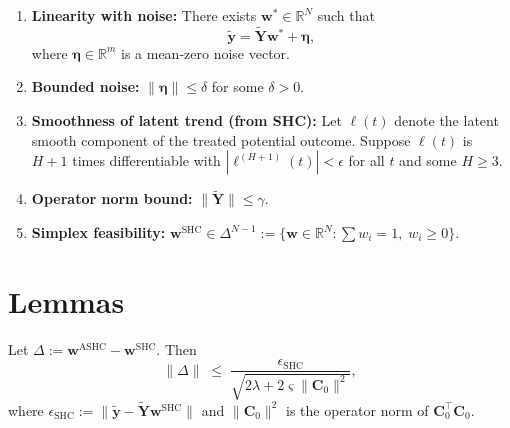 \documentclass{article}
\begin{document}
\begin{enumerate}
\item[\textbf{(A1)}] \textbf{Linearity with noise:} 
There exists $\mathbf{w}^* \in \mathbb{R}^N$ such that
\[
\widetilde{\mathbf{y}} = \widetilde{\mathbf{Y}} \mathbf{w}^* + \bm{\eta},
\]
where $\bm{\eta} \in \mathbb{R}^m$ is a mean-zero noise vector.

\item[\textbf{(A2)}] \textbf{Bounded noise:} 
$\|\bm{\eta}\| \leq \delta$ for some $\delta > 0$.

\item[\textbf{(A3)}] \textbf{Smoothness of latent trend (from SHC):} 
Let $\ell(t)$ denote the latent smooth component of the treated potential outcome.
Suppose $\ell(t)$ is $H+1$ times differentiable with $|\ell^{(H+1)}(t)| < \epsilon$
for all $t$ and some $H \geq 3$.

\item[\textbf{(A4)}] \textbf{Operator norm bound:} 
$\|\widetilde{\mathbf{Y}}\| \leq \gamma$.

\item[\textbf{(A5)}] \textbf{Simplex feasibility:} 
$\mathbf{w}^{\text{SHC}} \in \Delta^{N-1} := \{\mathbf{w} \in \mathbb{R}^N: \sum w_i = 1,\; w_i \geq 0\}$.
\end{enumerate}

\section*{Lemmas}

\begin{lemma}
\label{lem:delta}
Let $\Delta := \mathbf{w}^{\text{ASHC}} - \mathbf{w}^{\text{SHC}}$. Then
\[
\|\Delta\| \;\leq\; \frac{\epsilon_{\text{SHC}}}{\sqrt{2\lambda + 2\varsigma \|\mathbf{C}_0\|^2}},
\]
where $\epsilon_{\text{SHC}} := \|\widetilde{\mathbf{y}} - \widetilde{\mathbf{Y}}\mathbf{w}^{\text{SHC}}\|$ and $\|\mathbf{C}_0\|^2$ is the operator norm of $\mathbf{C}_0^\top \mathbf{C}_0$.
\end{lemma}
\end{document}
